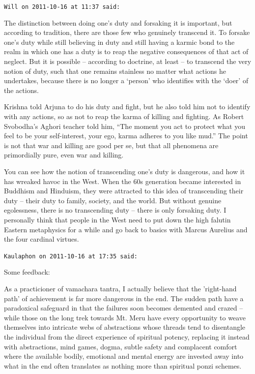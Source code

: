 \begin{footnotesize}
\begin{sffamily}
\hfill

\texttt{Will on 2011-10-16 at 11:37 said:}

The distinction between doing one's duty and forsaking it is important, but according to tradition, there are those few who genuinely transcend it. To forsake one's duty while still believing in duty and still having a karmic bond to the realm in which one has a duty is to reap the negative consequences of that act of neglect. But it is possible -- according to doctrine, at least -- to transcend the very notion of duty, such that one remains stainless no matter what actions he undertakes, because there is no longer a `person' who identifies with the `doer' of the actions.

Krishna told Arjuna to do his duty and fight, but he also told him not to identify with any actions, so as not to reap the karma of killing and fighting. As Robert Svobodha's Aghori teacher told him, ``The moment you act to protect what you feel to be your self-interest, your ego, karma adheres to you like mud.'' The point is not that war and killing are good per se, but that all phenomena are primordially pure, even war and killing.

You can see how the notion of transcending one's duty is dangerous, and how it has wreaked havoc in the West. When the 60s generation became interested in Buddhism and Hinduism, they were attracted to this idea of transcending their duty -- their duty to family, society, and the world. But without genuine egolessness, there is no transcending duty -- there is only forsaking duty. I personally think that people in the West need to put down the high falutin Eastern metaphysics for a while and go back to basics with Marcus Aurelius and the four cardinal virtues.

\hfill

\texttt{Kaulaphon on 2011-10-16 at 17:35 said:}

Some feedback:

As a practicioner of vamachara tantra, I actually believe that the 'right-hand path' of achievement is far more dangerous in the end. The sudden path have a paradoxical safeguard in that the failures soon becomes demented and crazed -- while those on the long trek towards Mt. Meru have every opportunity to weave themselves into intricate webs of abstractions whose threads tend to disentangle the individual from the direct experience of spiritual potency, replacing it instead with abstractions, mind games, dogma, subtle safety and complacent comfort where the available bodily, emotional and mental energy are invested away into what in the end often translates as nothing more than spiritual ponzi schemes.


\end{sffamily}
\end{footnotesize}
